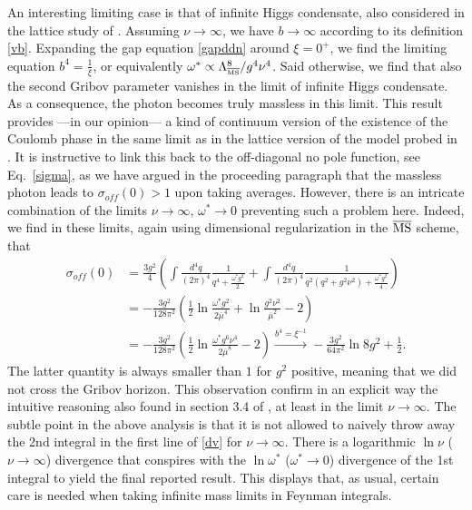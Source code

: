 An interesting limiting case is that of infinite Higgs condensate, also considered in the lattice study of \cite{Brower:1982yn}. Assuming $\nu\to\infty$, we have $b\to\infty$ according to its definition \eqref{vb}. Expanding the gap equation \eqref{gapddn} around $\xi=0^+$, we find the limiting equation $b^4=\frac{1}{\xi}$, or equivalently $\omega^*\propto \Lambda_{\overline{\mbox{\tiny{MS}}}}^8/g^4\nu^4$. Said otherwise, we find that also the second Gribov parameter vanishes in the limit of infinite Higgs condensate. As a consequence, the photon becomes truly massless in this limit. This result provides ---in our opinion--- a kind of continuum version of the existence of the Coulomb phase in the same limit as in the lattice version of the model probed in \cite{Brower:1982yn}. It is instructive to link this back to the off-diagonal no pole function, see Eq.~\eqref{sigma}, as we have argued in the proceeding paragraph that the massless photon leads to $\sigma_{off}(0)>1$ upon taking averages. However, there is an intricate combination of the limits $\nu\to\infty$, $\omega^*\to 0$ preventing such a problem here. Indeed, we find in these limits, again using dimensional regularization in the $\overline{\mbox{MS}}$ scheme, that
\begin{align}\label{dv}
  \sigma_{off}(0) &= \frac{3g^2}4 \left(\int \frac{d^4q}{(2\pi)^4} \frac1{q^4+\frac{\omega^\ast g^2}2} + \int \frac{d^4q}{(2\pi)^4} \frac1{q^2(q^2+g^2\nu^2)+\frac{\omega^\ast g^2}4}\right) \nonumber\\
	&= -\frac{3g^2}{128\pi^2} \left(\tfrac12 \ln\frac{\omega^\ast g^2}{2\overline\mu^4} + \ln\frac{g^2\nu^2}{\overline\mu^2}-2\right) \nonumber \\
	&= -\frac{3g^2}{128\pi^2} \left(\tfrac12 \ln\frac{\omega^\ast g^6\nu^4}{2\overline\mu^8}-2\right) \stackrel{b^4=\xi^{-1}}{\longrightarrow} -\frac{3g^2}{64\pi^2} \ln 8g^2 + \frac12.
\end{align}
The latter quantity is always smaller than $1$ for $g^2$ positive, meaning that we did not cross the Gribov horizon. This observation confirm in an explicit way the intuitive reasoning also found in section 3.4 of \cite{Lenz:2000zt}, at least in the limit $\nu\to\infty$. The subtle point in the above analysis is that it is not allowed to naively throw away the 2nd integral in the first line of \eqref{dv} for $\nu\to\infty$. There is a logarithmic $\ln\nu$ ($\nu\to\infty$) divergence that conspires with the $\ln \omega^*$ ($\omega^*\to0$) divergence of the 1st integral to yield the final reported result. This displays that, as usual, certain care is needed when taking infinite mass limits in Feynman integrals. 









